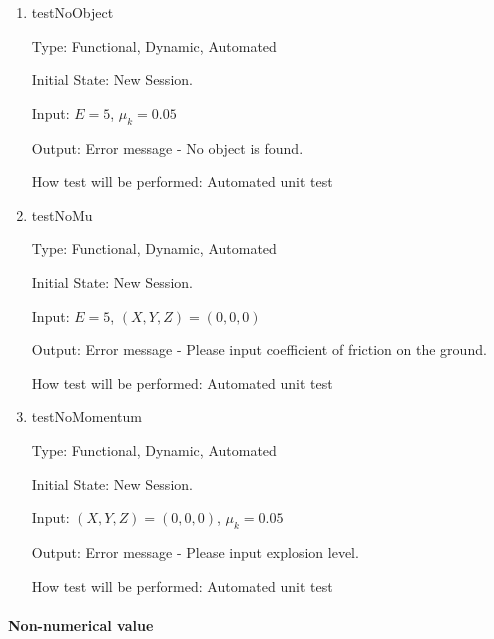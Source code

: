 \documentclass[12pt, titlepage]{article}
\begin{document}
\begin{enumerate}
	
\item{testNoObject\\}

Type: Functional, Dynamic, Automated
					
Initial State: New Session.
					
Input: $E = 5$, $\mu_{k} = 0.05$
					
Output: Error message - No object is found.
					
How test will be performed: Automated unit test
					
\item{testNoMu\\}

Type: Functional, Dynamic, Automated

Initial State: New Session.

Input: $E = 5$, $(X,Y,Z) = (0,0,0)$  

Output: Error message - Please input coefficient of friction on the ground.

How test will be performed: Automated unit test

\item{testNoMomentum\\}

Type: Functional, Dynamic, Automated

Initial State: New Session.

Input: $(X,Y,Z) = (0,0,0)$, $\mu_{k} = 0.05$  

Output: Error message - Please input explosion level.

How test will be performed: Automated unit test

\end{enumerate}

\paragraph{Non-numerical value}
\end{document}
